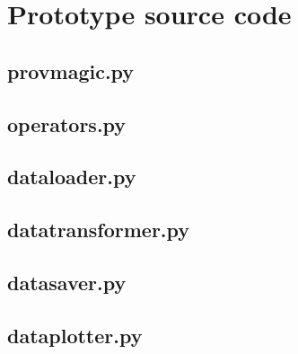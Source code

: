  
\appendix    %

\chapter{Prototype source code}
\section{provmagic.py}

\section{operators.py}

\section{dataloader.py}

\section{datatransformer.py}

\section{datasaver.py}

\section{dataplotter.py}


% 

